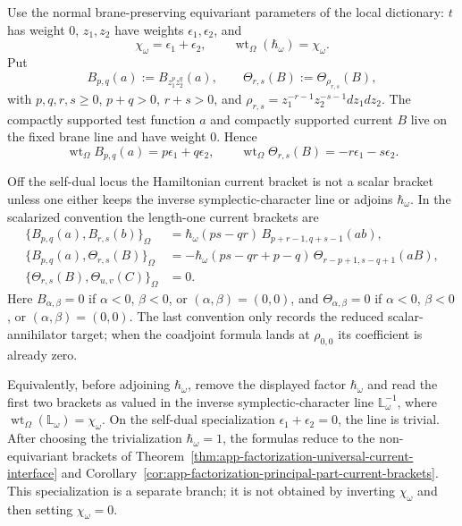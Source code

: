 \begin{thm}
\label{thm:app-omega-weighted-current-brackets}
  Use the normal brane-preserving equivariant parameters of the local
  dictionary:
  \(t\) has weight \(0\),
  \(z_1,z_2\) have weights \(\epsilon_1,\epsilon_2\), and
  \[
    \chi_\omega=\epsilon_1+\epsilon_2,\qquad
    \operatorname{wt}_\Omega(\hbar_\omega)=\chi_\omega .
  \]
  Put
  \[
    B_{p,q}(a):=B_{z_1^p z_2^q}(a),\qquad
    \Theta_{r,s}(B):=\Theta_{\rho_{r,s}}(B),
  \]
  with \(p,q,r,s\geq0\), \(p+q>0\), \(r+s>0\), and
  \(\rho_{r,s}=z_1^{-r-1}z_2^{-s-1}dz_1dz_2\).
  The compactly supported test function \(a\) and compactly supported
  current \(B\) live on the fixed brane line and have weight \(0\).  Hence
  \[
    \operatorname{wt}_\Omega B_{p,q}(a)=p\epsilon_1+q\epsilon_2,
    \qquad
    \operatorname{wt}_\Omega \Theta_{r,s}(B)
      =-r\epsilon_1-s\epsilon_2 .
  \]

  Off the self-dual locus the Hamiltonian current bracket is not a scalar
  bracket unless one either keeps the inverse symplectic-character line or
  adjoins \(\hbar_\omega\).  In the scalarized convention the
  length-one current brackets are
  \[
  \begin{aligned}
    \{B_{p,q}(a),B_{r,s}(b)\}_{\Omega}
      &=
      \hbar_\omega(ps-qr)\,
      B_{p+r-1,q+s-1}(ab),\\
    \{B_{p,q}(a),\Theta_{r,s}(B)\}_{\Omega}
      &=
      -\hbar_\omega(ps-qr+p-q)\,
      \Theta_{r-p+1,s-q+1}(aB),\\
    \{\Theta_{r,s}(B),\Theta_{u,v}(C)\}_{\Omega}
      &=0 .
  \end{aligned}
  \]
  Here \(B_{\alpha,\beta}=0\) if \(\alpha<0\), \(\beta<0\), or
  \((\alpha,\beta)=(0,0)\), and
  \(\Theta_{\alpha,\beta}=0\) if \(\alpha<0\), \(\beta<0\), or
  \((\alpha,\beta)=(0,0)\).  The last convention only records the reduced
  scalar-annihilator target; when the coadjoint formula lands at
  \(\rho_{0,0}\) its coefficient is already zero.

  Equivalently, before adjoining \(\hbar_\omega\), remove the displayed
  factor \(\hbar_\omega\) and read the first two brackets as valued in the
  inverse symplectic-character line
  \(\mathbb L_\omega^{-1}\), where
  \(\operatorname{wt}_\Omega(\mathbb L_\omega)=\chi_\omega\).
  On the self-dual specialization
  \(\epsilon_1+\epsilon_2=0\), the line is trivial.  After choosing the
  trivialization \(\hbar_\omega=1\), the formulas reduce to the
  non-equivariant brackets of
  Theorem~\ref{thm:app-factorization-universal-current-interface} and
  Corollary~\ref{cor:app-factorization-principal-part-current-brackets}.
  This specialization is a separate branch; it is not obtained by
  inverting \(\chi_\omega\) and then setting \(\chi_\omega=0\).


\end{thm}
